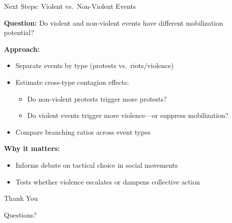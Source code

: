 \documentclass[aspectratio=169]{beamer}
\begin{document}
\begin{frame}{Next Steps: Violent vs.\ Non-Violent Events}

\textbf{Question:} Do violent and non-violent events have different mobilization potential?

\vspace{1em}

\textbf{Approach:}
\begin{itemize}
    \item Separate events by type (protests vs.\ riots/violence)
    \item Estimate cross-type contagion effects:
    \begin{itemize}
        \item Do non-violent protests trigger more protests?
        \item Do violent events trigger more violence---or suppress mobilization?
    \end{itemize}
    \item Compare branching ratios across event types
\end{itemize}

\vspace{1em}

\textbf{Why it matters:}
\begin{itemize}
    \item Informs debate on tactical choice in social movements
    \item Tests whether violence escalates or dampens collective action
\end{itemize}

\end{frame}

\begin{frame}[standout]
    Thank You

    \vspace{1em}

    \normalsize
    Questions?
\end{frame}


\appendix
\end{document}
